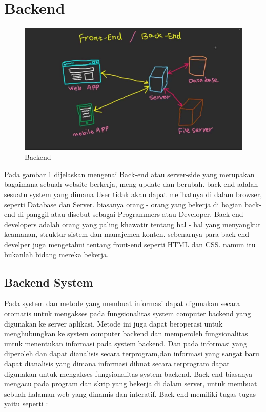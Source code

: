 

\section{Backend}

\begin{figure}[h]
\centerline{\includegraphics[width=1\textwidth]{figures/3backend.jpg}}
\caption{Backend}
\label{backend}
\end{figure}

	Pada gambar \ref{backend} dijelaskan mengenai Back-end atau server-side yang merupakan bagaimana sebuah website berkerja, meng-update
dan berubah. back-end adalah sesuatu system yang dimana User tidak akan dapat melihatnya di dalam browser,
seperti Database dan Server. biasanya orang - orang yang bekerja di bagian back-end di panggil atau disebut sebagai
Programmers atau Developer. Back-end developers adalah orang yang paling khawatir tentang hal - hal yang menyangkut keamanan,
struktur sistem dan manajemen konten. sebenarnya para back-end develper juga mengetahui tentang front-end seperti HTML dan CSS.
namun itu bukanlah bidang mereka bekerja. 

\subsection{Backend System}
	Pada system dan metode  yang membuat informasi dapat digunakan secara oromatis untuk mengakses 
pada fungsionalitas system computer backend yang digunakan ke server aplikasi. 
Metode ini juga dapat beroperasi untuk menghubungkan ke system computer backend dan memperoleh 
fungsionalitas untuk menentukan informasi  pada system backend. Dan pada informasi yang diperoleh 
dan dapat dianalisis secara terprogram,dan informasi yang sangat baru dapat dianalisis yang dimana 
informasi dibuat secara terprogram dapat digunakan untuk mengakses fungsionalitas system backend.
Back-end biasanya mengacu pada program dan skrip yang bekerja di dalam server, untuk membuat sebuah 
halaman web yang dinamis dan interatif. Back-end memiliki tugas-tugas yaitu seperti :

